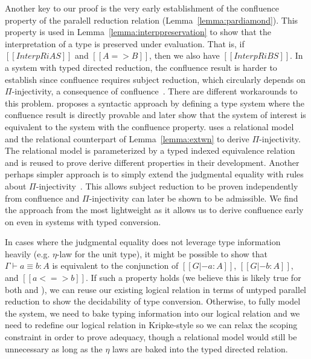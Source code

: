 \documentclass[acmsmall,screen=true,
\ifpublic review=false\else,review=true\fi
  ,anonymous=\ifanonymous true\else false\fi]{acmart}
\newcommand{\scw}[1]{}
\begin{document}

Another key to our proof is the very early establishment of the confluence
property of the paralell reduction relation
(Lemma~\ref{lemma:pardiamond}). This property is used in
Lemma~\ref{lemma:interppreservation} to show that the interpretation
of a type is preserved under evaluation. That is, if $[[InterpR i A
S]]$ and $[[A => B]]$, then we also have $[[InterpR i B S]]$.
In a system with typed directed reduction, the confluence result is
harder to establish since confluence requires subject reduction, which
circularly depends on $\Pi$-injectivity, a consequence of
confluence~\citep{siles2012pure}. There are different workarounds to
this problem. \citet{siles2012pure} proposes a syntactic approach by
defining a type system where the confluence result is
directly provable and later show that the system of interest is
equivalent to the system with the confluence property.
\citet{decagda} uses a relational model and the relational counterpart
of Lemma~\ref{lemma:extwn} to derive $\Pi$-injectivity. The relational
model is parameterized by a typed indexed equivalence relation and
is reused to prove derive different properties in their
development. Another perhaps simpler approach is to simply
extend the judgmental equality with rules about
$\Pi$-injectivity~\citep{weirich:systemd}. This allows subject
reduction to be proven independently from confluence and
$\Pi$-injectivity can later be shown to be admissible. We find the
approach from \citep{weirich:systemd} the most lightweight as it
allows us to derive confluence early on even in systems with typed
conversion. \scw{Maybe mention my $\eta$-equivalence paper here somewhere?}

In cases where the judgmental equality does not leverage type information heavily
(e.g. $\eta$-law for the unit type), it might be possible to show that
$\Gamma \vdash a \equiv b : A$ is equivalent to the conjunction of
$[[G |- a : A]]$, $[[G |- b : A ]]$, and $[[a <=> b]]$. If such a
property holds (we believe this is likely true for both
\citet{decagda} and \citet{martin-lof-a-la-coq}), we can reuse our existing logical relation in
terms of untyped parallel reduction to show the decidability of type
conversion. Otherwise, to fully model the system, we need to bake
typing information into our logical relation and we need to redefine
our logical relation in Kripke-style so we can relax the scoping
constraint in order to prove adequacy, though a relational model would
still be unnecessary as long as the $\eta$ laws are baked into the
typed directed relation. \scw{not sure I understand this last bit}
\end{document}
